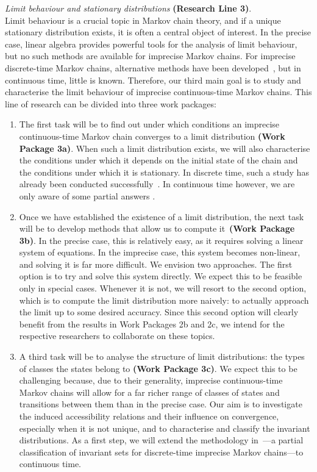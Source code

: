 \documentclass[11pt,dvipsnames,usenames,a4paper]{article}
\begin{document}
\emph{Limit behaviour and stationary distributions} {\bf (Research Line 3)}.\\[3pt]
Limit behaviour is a crucial topic in Markov chain theory, and if a unique stationary distribution exists, it is often a central object of interest. 
In the precise case, linear algebra provides powerful tools for the analysis of limit behaviour, but no such methods are available for imprecise Markov chains. 
For imprecise discrete-time Markov chains, alternative methods have been developed~\cite{cooman2008}, but in continuous time, little is known. 
Therefore, our third main goal is to study and characterise the limit behaviour of imprecise continuous-time Markov chains. 
This line of research can be divided into three work packages:
\begin{enumerate}[label=\tiny$\blacksquare$,leftmargin=*,noitemsep]
\item The first task will be to find out under which conditions an imprecise continuous-time Markov chain converges to a limit distribution {\bf (Work Package 3a)}. 
When such a limit distribution exists, we will also characterise the conditions under which it depends on the initial state of the chain and the conditions under which it is stationary. 
In discrete time, such a study has already been conducted successfully~\cite{hermans2012,cooman2008}. 
In continuous time however, we are only aware of some partial answers \cite{DeBock:2016:iCTMClimit}.
\item Once we have established the existence of a limit distribution, the next task will be to develop methods that allow us to compute it~{\bf (Work Package 3b)}. 
In the precise case, this is relatively easy, as it requires solving a linear system of equations. 
In the imprecise case, this system becomes non-linear, and solving it is far more difficult. 
We envision two approaches. 
The first option is to try and solve this system directly. 
We expect this to be feasible only in special cases. 
Whenever it is not, we will resort to the second option, which is to compute the limit distribution more naively: to actually approach the limit up to some desired accuracy. 
Since this second option will clearly benefit from the results in Work Packages 2b and 2c, we intend for the respective researchers to collaborate on these topics.
\item A third task will be to analyse the structure of limit distributions: the types of classes the states belong to {\bf (Work Package 3c)}.
We expect this to be challenging because, due to their generality, imprecise continuous-time Markov chains will allow for a far richer range of classes of states and transitions between them than in the precise case. 
Our aim is to investigate the induced accessibility relations and their influence on convergence, especially when it is not unique, and to characterise and classify the invariant distributions. 
As a first step, we will extend the methodology in~\cite{skulj:13b}---a partial classification of invariant sets for discrete-time imprecise Markov chains---to continuous time. 
\end{enumerate}
\end{document}
